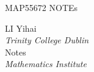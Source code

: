 \documentclass[a4paper,10pt]{report}
\begin{document}
\begin{center}
  \begin{minipage}{0.8\textwidth}
    \centering
    \Huge MAP55672 NOTEs
  \end{minipage}
\end{center}
\vspace*{.5em}
\begin{multicols}{2}
  \begin{center}
    LI Yihai \\
    {\itshape Trinity College Dublin}\\
    Notes \\
    {\itshape Mathematics Institute}
  \end{center}
\end{multicols}
\vspace*{1em}


\begin{multicols}{2}

% 
% 
% 
% 
% 
\end{multicols}

% 
% 
% 
\end{document}
